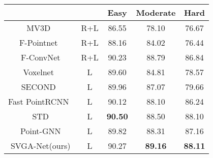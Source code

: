\documentclass{article}
\begin{document}
\begin{table}[htbp]
\begin{minipage}[htbp]{0.45\linewidth}
{\begin{tabular}{ccccc}
            \cmidrule(r){3-5}
                  &    & Easy & Moderate & Hard \\ \hline
MV3D~\cite{chen2017multi} & R+L & 86.55 & 78.10  & 76.67 \\
F-Pointnet~\cite{qi2018frustum} & R+L & 88.16 & 84.02  & 76.44 \\
F-ConvNet\cite{wang2019frustum} & R+L & 90.23 & 88.79 & 86.84\\\hline
Voxelnet~\cite{zhou2018voxelnet} &   L   & 89.60 & 84.81  & 78.57 \\
SECOND~\cite{yan2018second} &   L   & 89.96 & 87.07  & 79.66 \\
Fast PointRCNN~\cite{chen2019fast} &   L   & 90.12 & 88.10  & 86.24 \\
STD\cite{yang2019std} &   L & {\bf90.50} & 88.50 & 88.10 \\
Point-GNN\cite{Point-GNN} & L & 89.82 & 88.31 & 87.16\\\hline
SVGA-Net(ours) &  L  & 90.27 & {\bf89.16}  & {\bf88.11} \\
            \bottomrule
        \end{tabular}}
\end{minipage}
\end{table}
\end{document}
